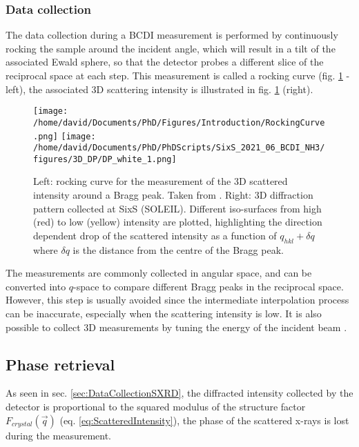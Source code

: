 \subsubsection{Data collection} \label{sec:DataCollectionBCDI}

The data collection during a BCDI measurement is performed by continuously rocking the sample around the incident angle, which will result in a tilt of the associated Ewald sphere, so that the detector probes a different slice of the reciprocal space at each step.
This measurement is called a rocking curve (fig. \ref{fig:3DDP} - left), the associated 3D scattering intensity is illustrated in fig. \ref{fig:3DDP} (right).

\begin{figure}[!htb]
    \centering
    \texttt{[image: /home/david/Documents/PhD/Figures/Introduction/RockingCurve.png]}
    \texttt{[image: /home/david/Documents/PhD/PhDScripts/SixS\_2021\_06\_BCDI\_NH3/figures/3D\_DP/DP\_white\_1.png]}
    \caption{
    Left: rocking curve for the measurement of the 3D scattered intensity around a Bragg peak. Taken from \cite{Willmott}.
    Right: 3D diffraction pattern collected at SixS (SOLEIL).
    Different iso-surfaces from high (red) to low (yellow) intensity are plotted, highlighting the direction dependent drop of the scattered intensity as a function of $q_{hkl}+\delta q$ where $\delta q$ is the distance from the centre of the Bragg peak.
    }
    \label{fig:3DDP}
\end{figure}

The measurements are commonly collected in angular space, and can be converted into $q$-space to compare different Bragg peaks in the reciprocal space.
However, this step is usually avoided since the intermediate interpolation process can be inaccurate, especially when the scattering intensity is low.
It is also possible to collect 3D measurements by tuning the energy of the incident beam \parencite{Cornelius2011}.

\subsection{Phase retrieval}\label{sec:PhaseRetrieval}

As seen in sec. \ref{sec:DataCollectionSXRD}, the diffracted intensity collected by the detector is proportional to the squared modulus of the structure factor $F_{crystal}(\vec{q})$ (eq. \ref{eq:ScatteredIntensity}), the phase of the scattered x-rays is lost during the measurement.

